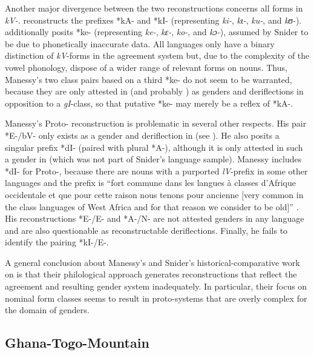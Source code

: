 \documentclass[output=collectionpaper]{langsci/langscibook}
\begin{document}
Another major divergence between the two reconstructions concerns all forms in \textit{kV-}. \citet[147--148]{Snider1988} reconstructs the prefixes *kA- and *kI- (representing \textit{ki-}, \textit{kɩ{}-}, \textit{ku-}, and \textit{kʊ-}). \citet[12]{Manessy1987} additionally posits *ke- (representing \textit{ke-}, \textit{kɛ-}, \textit{ko-}, and \textit{kɔ-}), assumed by Snider to be due to phonetically inaccurate data. All  languages only have a binary distinction of \textit{kV}{}-forms in the agreement system but, due to the complexity of the vowel phonology, dispose of a wider range of relevant forms on nouns. Thus, Manessy's two class pairs based on a third *ke- do not seem to be warranted, because they are only attested in  (and probably ) as genders and deriflections in opposition to a \textit{gI}{}-class, so that putative *ke- may merely be a reflex of *kA-.

Manessy's Proto- reconstruction is problematic in several other respects. His pair *E-/bV- only exists as a gender and deriflection in  (see ). He also posits a singular prefix *dI- (paired with plural *A-), although it is only attested in such a gender in  (which was not part of Snider's language sample). Manessy includes *dI- for Proto-, because there are nouns with a purported \textit{lV}{}-prefix in some other  languages and the prefix is ``fort commune dans les langues à classes d'Afrique occidentale et que pour cette raison nous tenons pour ancienne [very common in the class languages of West Africa and for that reason we consider to be old]'' \citep[41]{Manessy1987}. His reconstructions *E-/E- and *A-/N- are not attested genders in any language and are also questionable as reconstructable deriflections. Finally, he fails to identify the pairing *kI-/E-.

A general conclusion about Manessy's and Snider's historical-comparative work on  is that their philological approach generates reconstructions that reflect the agreement and resulting gender system inadequately. In particular, their focus on nominal form classes seems to result in proto-systems that are overly complex for the domain of genders.


\subsection{Ghana-Togo-Mountain}
\label{sec:Gueld:3.4}
\end{document}

